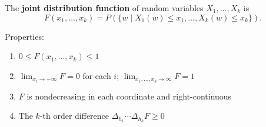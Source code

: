 The \textbf{joint distribution function} of random variables $X_1, \ldots, X_k$ is
$$F(x_1, \ldots, x_k) = P(\{w \mid X_1(w) \leq x_1, \ldots, X_k(w) \leq x_k\}).$$

Properties:
\begin{enumerate}
\item $0 \leq F(x_1, \ldots, x_k) \leq 1$
\item $\lim_{x_i \to -\infty} F = 0$ for each $i$; $\lim_{x_1,\ldots,x_k \to \infty} F = 1$
\item $F$ is nondecreasing in each coordinate and right-continuous
\item The $k$-th order difference $\Delta_{h_1}\cdots\Delta_{h_k} F \geq 0$
\end{enumerate}
